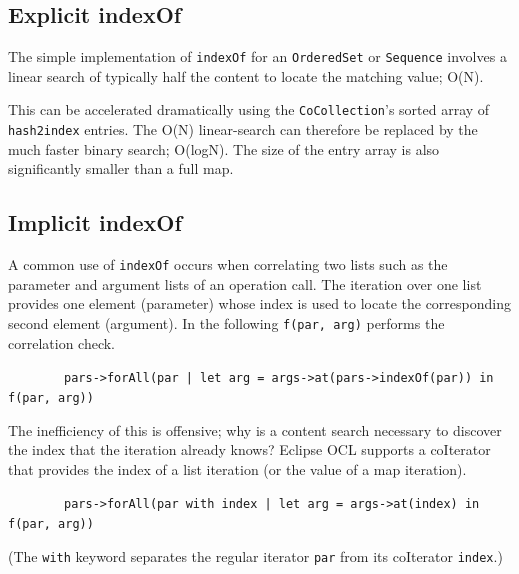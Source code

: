 \documentclass[
]{ceurart}
\begin{document}
\subsection{Explicit indexOf}

The simple implementation of \verb!indexOf! for an \verb!OrderedSet! or \verb!Sequence! involves a linear search of typically half the content to locate the matching value; O(N).

This can be accelerated dramatically using the \verb!CoCollection!'s sorted array of \verb!hash2index! entries. The O(N) linear-search can therefore be replaced by the much faster binary search; O(logN). The size of the entry array is also significantly smaller than a full map.

\subsection{Implicit indexOf}

A common use of \verb!indexOf! occurs when correlating two lists such as the parameter and argument lists of an operation call. The iteration over one list provides one element (parameter) whose index is used to locate the corresponding second element (argument). In the following \verb!f(par, arg)! performs the correlation check.

\begin{description}[itemsep=-0.2cm]\vspace{-10pt}\small
\item ~~~~~~~~\verb!pars->forAll(par | let arg = args->at(pars->indexOf(par)) in f(par, arg))!
\vspace{-10pt}\end{description}

The inefficiency of this is offensive; why is a content search necessary to discover the index that the iteration already knows? Eclipse OCL supports a coIterator \cite{willink2019map} that provides the index of a list iteration (or the value of a map iteration).

\begin{description}[itemsep=-0.2cm]\vspace{-10pt}\small
\item ~~~~~~~~\verb!pars->forAll(par with index | let arg = args->at(index) in f(par, arg))!
\vspace{-10pt}\end{description}

(The \verb!with! keyword separates the regular iterator \verb!par! from its coIterator \verb!index!.)
\end{document}
